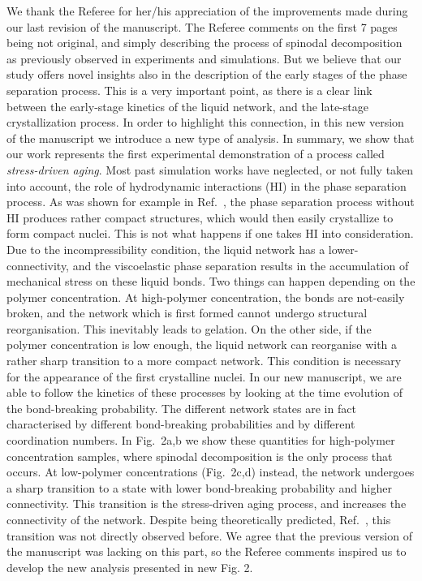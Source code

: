 \documentclass[11pt,a4paper]{article}
\begin{document}
We thank the Referee for her/his appreciation of the improvements made during our last revision of the manuscript. The Referee comments on the first 7 pages being not original, and simply describing the process of spinodal decomposition as previously observed in experiments and simulations. But we believe that our study offers novel insights also in the description of the early stages of the phase separation process. This is a very important point, as there is a clear link between the early-stage kinetics of the liquid network, and the late-stage crystallization process. In order to highlight this connection, in this new version of the manuscript we introduce a new type of analysis. In summary, we show that our work represents the first experimental demonstration of a process called \emph{stress-driven aging}. Most past simulation works have neglected, or not fully taken into account, the role of hydrodynamic interactions (HI) in the phase separation process. As was shown for example in Ref.~\cite{
furukawa2010key}, the phase separation process without HI produces rather compact structures, which would then easily crystallize to form compact nuclei. This is not what happens if one takes HI into consideration. Due to the incompressibility condition, the liquid network has a lower-connectivity, and the viscoelastic phase separation results in the accumulation of mechanical stress on these liquid bonds. Two things can happen depending on the polymer concentration. At high-polymer concentration, the bonds are not-easily broken, and the network which is first formed cannot undergo structural reorganisation. This inevitably leads to gelation. On the other side, if the polymer concentration is low enough, the liquid network can reorganise with a rather sharp transition to a more compact network. This condition is necessary for the appearance of the first crystalline nuclei. In our new manuscript, we are able to follow the kinetics of these processes by looking at the time evolution of the bond-breaking 
probability. The different network states are in fact characterised by different bond-breaking probabilities and by different coordination numbers. In Fig.~2a,b we show these quantities for high-polymer concentration samples, where spinodal decomposition is the only process that occurs. At low-polymer concentrations (Fig.~2c,d) instead, the network undergoes a sharp transition to a state with lower bond-breaking probability and higher connectivity. This transition is the stress-driven aging process, and increases the connectivity of the network. Despite being theoretically predicted, Ref.~\cite{tanaka2000,tanaka2007spontaneous}, this transition was not directly observed before.
We agree that the previous version of the manuscript was lacking on this part, so the Referee comments inspired us to develop the new analysis presented in new Fig. 2.
\end{document}

